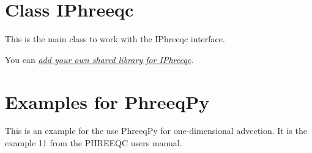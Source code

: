 \documentclass[letterpaper,10pt,english]{sphinxmanual}
\begin{document}
\chapter{Class IPhreeqc}
\label{iphreeqc:class-iphreeqc}\label{iphreeqc::doc}\label{iphreeqc:sent-us-you-email-address}
This is the main class to work with the IPhreeqc interface.

You can {\hyperref[index:installation]{\emph{add your own shared library for IPhreeqc}}}.


\chapter{Examples for PhreeqPy}
\label{examples:examples-for-phreeqpy}\label{examples::doc}
This is an example for the use PhreeqPy for one-dimensional advection.
It is the example 11 from the PHREEQC users manual.
\end{document}
